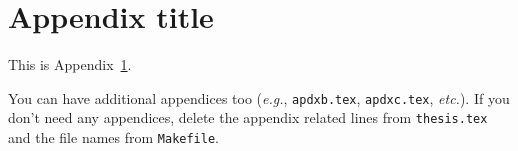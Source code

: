 \chapter{Appendix title}
\label{apdx:somelabel}
This is Appendix~\ref{apdx:somelabel}.

You can have additional appendices too
(\emph{e.g.}, \texttt{apdxb.tex}, \texttt{apdxc.tex}, \emph{etc.}).
If you don't need any appendices, delete the appendix
related lines from \texttt{thesis.tex} and the file names
from \texttt{Makefile}.
